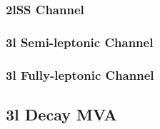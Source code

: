 \subsubsection{2lSS Channel}                                                                          
\label{subsec:pt2lSS}                                                                                           



 
\subsubsection{ 3l Semi-leptonic Channel}                                                                            
\label{subsec:pt3lS}                                                                                                    



 
\subsubsection{ 3l Fully-leptonic Channel}                                                                            
\label{subsec:pt3lF}                                                                                                    




\subsection{3l Decay MVA}
\label{subsec:decayMVA}



